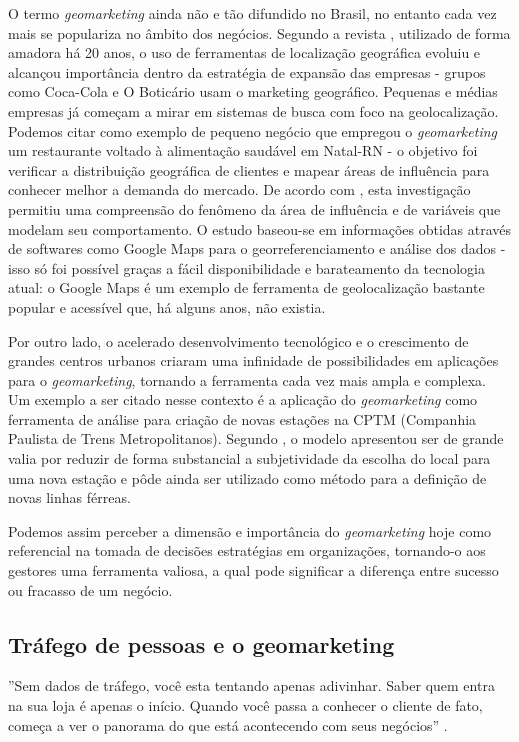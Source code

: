 O termo \emph{geomarketing} ainda não e tão difundido no Brasil, no entanto cada
vez mais se populariza no âmbito dos negócios. Segundo a revista
, utilizado de forma amadora há 20 anos, o uso de ferramentas
de localização geográfica evoluiu e alcançou importância dentro da estratégia de
expansão das empresas - grupos como Coca-Cola e O Boticário usam o marketing
geográfico. Pequenas e médias empresas já começam a mirar em sistemas de busca
com foco na geolocalização. Podemos citar como exemplo de pequeno negócio que
empregou o \emph{geomarketing} um restaurante voltado à alimentação saudável em
Natal-RN - o objetivo foi verificar a distribuição geográfica de clientes e
mapear áreas de influência para conhecer melhor a demanda do mercado. De acordo
com , esta investigação permitiu uma compreensão do
fenômeno da área de influência e de variáveis que modelam seu comportamento. O
estudo baseou-se em informações obtidas através de softwares como Google
Maps para o georreferenciamento e análise dos dados - isso só foi possível
graças a fácil disponibilidade e barateamento da tecnologia atual: o
Google Maps é um exemplo de ferramenta de geolocalização bastante popular
e acessível que, há alguns anos, não existia.

Por outro lado, o acelerado desenvolvimento tecnológico e o crescimento de
grandes centros urbanos criaram uma infinidade de possibilidades em aplicações
para o \emph{geomarketing}, tornando a ferramenta cada vez mais ampla e
complexa. Um exemplo a ser citado nesse contexto é a aplicação do
\emph{geomarketing} como ferramenta de análise para criação de novas estações na
CPTM (Companhia Paulista de Trens Metropolitanos). Segundo
, o modelo apresentou ser de grande valia por reduzir de
forma substancial a subjetividade da escolha do local para uma nova estação e
pôde ainda ser utilizado como método para a definição de novas linhas férreas.

Podemos assim perceber a dimensão e importância do \emph{geomarketing} hoje como
referencial na tomada de decisões estratégias em organizações,
tornando-o aos gestores uma ferramenta valiosa, a qual pode significar a
diferença entre sucesso ou fracasso de um negócio.

\subsection{Tráfego de pessoas e o geomarketing}

''Sem dados de tráfego, você esta tentando apenas adivinhar. Saber quem entra na sua loja é apenas o início. Quando você passa a conhecer o cliente de fato, começa a ver o panorama do que está acontecendo com seus negócios'' \cite{Shoppertrak2017}.

